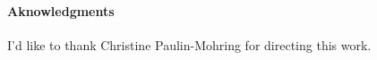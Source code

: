 \documentclass{llncs}
\begin{document}
\paragraph{Aknowledgments}
I'd like to thank Christine Paulin-Mohring for directing this work.




\renewcommand{\thefootnote}{}
\end{document}
